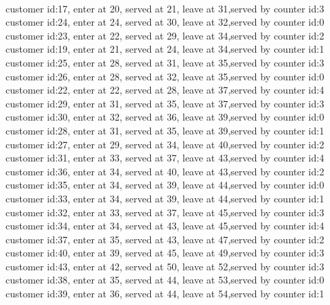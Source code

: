 \documentclass[UTF8]{ctexart}
\begin{document}
\\
customer id:17, enter at 20, served at 21, leave at 31,served by counter id:3
\\
customer id:24, enter at 24, served at 30, leave at 32,served by counter id:0
\\
customer id:23, enter at 22, served at 29, leave at 34,served by counter id:2
\\
customer id:19, enter at 21, served at 24, leave at 34,served by counter id:1
\\
customer id:25, enter at 28, served at 31, leave at 35,served by counter id:3
\\
customer id:26, enter at 28, served at 32, leave at 35,served by counter id:0
\\
customer id:22, enter at 22, served at 28, leave at 37,served by counter id:4
\\
customer id:29, enter at 31, served at 35, leave at 37,served by counter id:3
\\
customer id:30, enter at 32, served at 36, leave at 39,served by counter id:0
\\
customer id:28, enter at 31, served at 35, leave at 39,served by counter id:1
\\
customer id:27, enter at 29, served at 34, leave at 40,served by counter id:2
\\
customer id:31, enter at 33, served at 37, leave at 43,served by counter id:4
\\
customer id:36, enter at 34, served at 40, leave at 43,served by counter id:2
\\
customer id:35, enter at 34, served at 39, leave at 44,served by counter id:0
\\
customer id:33, enter at 34, served at 39, leave at 44,served by counter id:1
\\
customer id:32, enter at 33, served at 37, leave at 45,served by counter id:3
\\
customer id:34, enter at 34, served at 43, leave at 45,served by counter id:4
\\
customer id:37, enter at 35, served at 43, leave at 47,served by counter id:2
\\
customer id:40, enter at 39, served at 45, leave at 49,served by counter id:3
\\
customer id:43, enter at 42, served at 50, leave at 52,served by counter id:3
\\
customer id:38, enter at 35, served at 44, leave at 53,served by counter id:0
\\
customer id:39, enter at 36, served at 44, leave at 54,served by counter id:1
\end{document}
